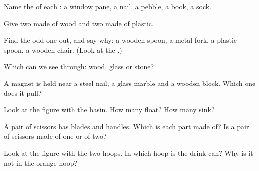 \begin{exercise}[$\star$]\label{exo:g1:materials-around-us:2}
Name the  of each : a window pane, a nail, a pebble, a
book, a sock.
\end{exercise}

\begin{exercise}[$\star$]\label{exo:g1:materials-around-us:3}
Give two  made of wood and two  made of plastic.
\end{exercise}

\begin{exercise}[$\star$]\label{exo:g1:materials-around-us:4}
Find the odd one out, and say why: a wooden spoon, a metal fork, a
plastic spoon, a wooden chair. (Look at the .)
\end{exercise}

\begin{exercise}[$\star$]\label{exo:g1:materials-around-us:5}
Which  can we see through: wood, glass or stone?
\end{exercise}

\begin{exercise}[$\star$]\label{exo:g1:materials-around-us:6}
A magnet is held near a steel nail, a glass marble and a wooden block.
Which one does it pull?
\end{exercise}

\begin{exercise}[$\star$]\label{exo:g1:materials-around-us:7}
Look at the figure with the basin. How many  float? How many
sink?
\end{exercise}

\begin{exercise}[$\star$]\label{exo:g1:materials-around-us:8}
A pair of scissors has blades and handles. Which  is each part
made of? Is a pair of scissors made of one  or of two?
\end{exercise}

\begin{exercise}[$\star$]\label{exo:g1:materials-around-us:9}
Look at the figure with the two hoops. In which hoop is the drink can?
Why is it not in the orange hoop?
\end{exercise}

